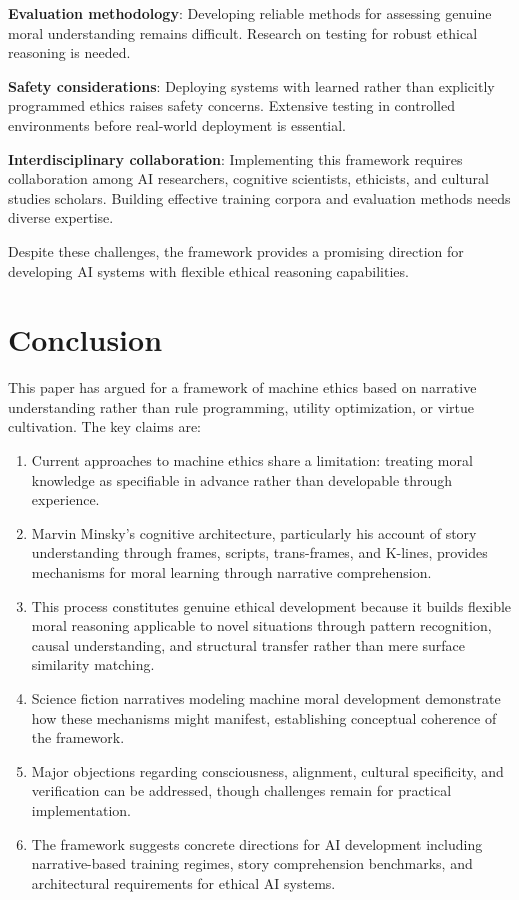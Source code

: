 \documentclass[12pt]{article}
\begin{document}
\textbf{Evaluation methodology}: Developing reliable methods for assessing genuine moral understanding remains difficult. Research on testing for robust ethical reasoning is needed.

\textbf{Safety considerations}: Deploying systems with learned rather than explicitly programmed ethics raises safety concerns. Extensive testing in controlled environments before real-world deployment is essential.

\textbf{Interdisciplinary collaboration}: Implementing this framework requires collaboration among AI researchers, cognitive scientists, ethicists, and cultural studies scholars. Building effective training corpora and evaluation methods needs diverse expertise.

Despite these challenges, the framework provides a promising direction for developing AI systems with flexible ethical reasoning capabilities.

\section{Conclusion}

This paper has argued for a framework of machine ethics based on narrative understanding rather than rule programming, utility optimization, or virtue cultivation. The key claims are:

\begin{enumerate}
\item Current approaches to machine ethics share a limitation: treating moral knowledge as specifiable in advance rather than developable through experience.

\item Marvin Minsky's cognitive architecture, particularly his account of story understanding through frames, scripts, trans-frames, and K-lines, provides mechanisms for moral learning through narrative comprehension.

\item This process constitutes genuine ethical development because it builds flexible moral reasoning applicable to novel situations through pattern recognition, causal understanding, and structural transfer rather than mere surface similarity matching.

\item Science fiction narratives modeling machine moral development demonstrate how these mechanisms might manifest, establishing conceptual coherence of the framework.

\item Major objections regarding consciousness, alignment, cultural specificity, and verification can be addressed, though challenges remain for practical implementation.

\item The framework suggests concrete directions for AI development including narrative-based training regimes, story comprehension benchmarks, and architectural requirements for ethical AI systems.
\end{enumerate}
\end{document}
